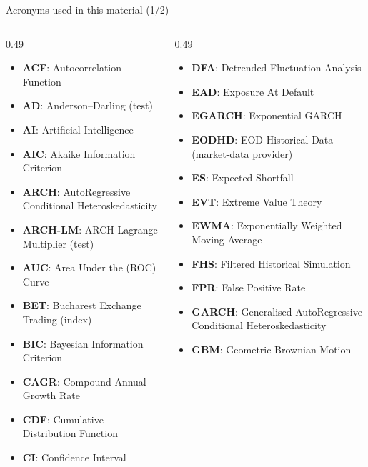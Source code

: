 {
\begin{frame}[noframenumbering]
    \titlepage
\end{frame}
}
\begin{frame}{Acronyms used in this material (1/2)}
\begin{columns}[T]
\begin{column}{0.49\textwidth}
\begin{itemize}\setlength{\itemsep}{0pt}
    \item \textbf{ACF}: Autocorrelation Function
    \item \textbf{AD}: Anderson–Darling (test)
    \item \textbf{AI}: Artificial Intelligence
    \item \textbf{AIC}: Akaike Information Criterion
    \item \textbf{ARCH}: AutoRegressive Conditional Heteroskedasticity
    \item \textbf{ARCH-LM}: ARCH Lagrange Multiplier (test)
    \item \textbf{AUC}: Area Under the (ROC) Curve
    \item \textbf{BET}: Bucharest Exchange Trading (index)
    \item \textbf{BIC}: Bayesian Information Criterion
    \item \textbf{CAGR}: Compound Annual Growth Rate
    \item \textbf{CDF}: Cumulative Distribution Function
    \item \textbf{CI}: Confidence Interval
\end{itemize}
\end{column}
\begin{column}{0.49\textwidth}
\begin{itemize}\setlength{\itemsep}{0pt}
    \item \textbf{DFA}: Detrended Fluctuation Analysis
    \item \textbf{EAD}: Exposure At Default
    \item \textbf{EGARCH}: Exponential GARCH
    \item \textbf{EODHD}: EOD Historical Data (market-data provider)
    \item \textbf{ES}: Expected Shortfall
    \item \textbf{EVT}: Extreme Value Theory
    \item \textbf{EWMA}: Exponentially Weighted Moving Average
    \item \textbf{FHS}: Filtered Historical Simulation
    \item \textbf{FPR}: False Positive Rate
    \item \textbf{GARCH}: Generalised AutoRegressive Conditional Heteroskedasticity
    \item \textbf{GBM}: Geometric Brownian Motion
\end{itemize}
\end{column}
\end{columns}
\end{frame}
